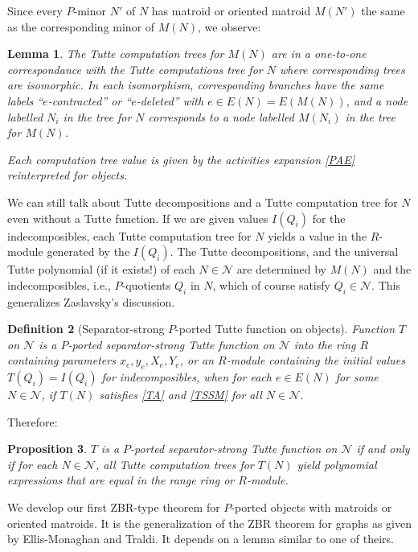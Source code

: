 \documentclass[12pt,leqno]{amsart}
\newtheorem{lem}{Lemma}
\newtheorem{prop}[lem]{Proposition}
\newtheorem{definition}[lem]{Definition}
\theoremstyle{remark}
\begin{document}
Since every $P$-minor $N'$ of $N$ has matroid
or oriented matroid $M(N')$ the same as the corresponding
minor of $M(N)$, we observe:

\begin{lem}
\label{ObjectTreeValueLemma}
The Tutte computation trees for $M(N)$ are in a one-to-one
correspondance with the 
Tutte computations tree for $N$ 
where corresponding trees are isomorphic.  In each
isomorphism,
corresponding
branches have the same labels ``$e$-contracted'' or
``$e$-deleted'' with $e\in E(N)=E(M(N))$, and a node
labelled $N_i$ in the tree for $N$ corresponds to 
a node labelled $M(N_i)$ in the tree for $M(N)$.

Each computation tree value is given by
the activities expansion \eqref{PAE} reinterpreted for
objects.
\end{lem}


We can still talk about Tutte decompositions and a
Tutte computation tree for $N$ even  without 
a Tutte function.  If we are given values $I(Q_i)$
for the indecomposibles, each Tutte computation tree 
for $N$ yields a value in the $R$-module generated by
the $I(Q_i)$.
The Tutte decompositions, and the universal
Tutte polynomial (if it exists!)
of each $N\in \mathcal{N}$
are determined by $M(N)$ and the indecomposibles, i.e., $P$-quotients
$Q_i$ in $N$, which of course satisfy $Q_i \in \mathcal{N}$.
This generalizes Zaslavsky's discussion\cite{MR93a:05047}.

\begin{definition}[Separator-strong $P$-ported Tutte function on objects]

Function
$T$ on $\mathcal{N}$
is a $P$-ported separator-strong Tutte function
on $\mathcal{N}$ into 
the ring $R$ 
containing parameters $x_e, y_e, X_e, Y_e$,
or an $R$-module containing the initial values
$T(Q_i)=I(Q_i)$ for indecomposibles,
when 
for each $e\in E(N)$ for some $N\in\mathcal{N}$,
if $T(N)$ satisfies \eqref{TA} and \eqref{TSSM} for all $N\in\mathcal{N}$.
\end{definition}

Therefore:

\begin{prop}
$T$ is a $P$-ported separator-strong Tutte function
on $\mathcal{N}$ if and only if for each $N\in\mathcal{N}$,
all Tutte computation trees for $T(N)$ yield polynomial expressions
that are equal in the range ring or $R$-module.
\end{prop}

We develop our first ZBR-type theorem for $P$-ported objects
with matroids or oriented matroids.  It is the
generalization of the ZBR theorem for graphs as given
by Ellis-Monaghan and Traldi\cite{Ellis-Monaghan-Traldi}.  
It depends on a lemma similar to one of theirs.
\end{document}
